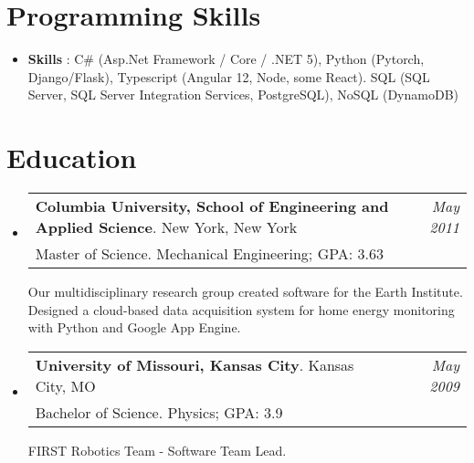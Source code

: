 \documentclass[letterpaper,11pt]{article}
\makeatletter
\newcommand{\resumeSubheading}[4]{
  \vspace{-2pt} %
  \item
    \begin{tabular*}{0.97\textwidth}{l@{\extracolsep{\fill}}r}
      \textbf{#1}. #2 & \textit{\small#4} \\
       {\small #3} \\

    \end{tabular*}
    \vspace{-5pt}
}
\newcommand{\resumeSubHeadingListStart}{\begin{itemize}[leftmargin=*]}
\newcommand{\resumeSubHeadingListEnd}{\end{itemize}}
\makeatother
\begin{document}
\section{Programming Skills}
  \resumeSubHeadingListStart
   \item{
     \textbf{Skills }{: C\# (Asp.Net Framework / Core / .NET 5), Python (Pytorch, Django/Flask), Typescript (Angular 12, Node, some React).
     SQL (SQL Server, SQL Server Integration Services, PostgreSQL), NoSQL (DynamoDB) }
   }
  \resumeSubHeadingListEnd

\section{Education}
\resumeSubHeadingListStart
  \resumeSubheading
    {Columbia University, School of Engineering and Applied Science}{New York, New York}
    {Master of Science. Mechanical Engineering;  GPA: 3.63}{May 2011}
    {Our multidisciplinary research group created software for the Earth Institute. Designed a cloud-based data acquisition system for home energy monitoring with Python and Google App Engine.}
    \resumeSubheading
    {University of Missouri, Kansas City}{Kansas City, MO}
    {Bachelor of Science. Physics;  GPA: 3.9}{May 2009}
    {FIRST Robotics Team - Software Team Lead.}
    \resumeSubHeadingListEnd


%


\end{document}
